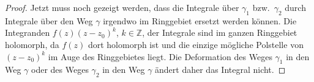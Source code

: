 \begin{proof}
Jetzt muss noch gezeigt werden, dass die Integrale über $\gamma_1$
bzw.~$\gamma_2$ durch Integrale über den Weg $\gamma$ irgendwo im
Ringgebiet ersetzt werden können.
Die Integranden $f(z)(z-z_0)^k$, $k\in\mathbb{Z}$, der Integrale
sind im ganzen Ringgebiet holomorph, da $f(z)$ dort holomorph ist
und die einzige mögliche Polstelle von $(z-z_0)^k$ im Auge des
Ringgebietes liegt.
Die Deformation des Weges $\gamma_1$ in den Weg $\gamma$ oder des
Weges $\gamma_2$ in den Weg $\gamma$ ändert daher das Integral
nicht.
\end{proof}
